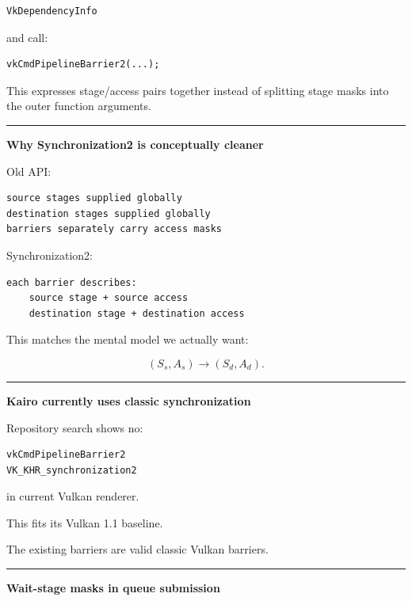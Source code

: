 \begin{verbatim}
VkDependencyInfo
\end{verbatim}

and call:

\begin{verbatim}
vkCmdPipelineBarrier2(...);
\end{verbatim}

This expresses stage/access pairs together instead of splitting stage masks into the outer function arguments.

\begin{center}\rule{0.5\linewidth}{0.5pt}\end{center}

\textbf{Why Synchronization2 is conceptually cleaner}

Old API:

\begin{verbatim}
source stages supplied globally
destination stages supplied globally
barriers separately carry access masks
\end{verbatim}

Synchronization2:

\begin{verbatim}
each barrier describes:
    source stage + source access
    destination stage + destination access
\end{verbatim}

This matches the mental model we actually want:

\[
(S_s,A_s)\rightarrow(S_d,A_d).
\]

\begin{center}\rule{0.5\linewidth}{0.5pt}\end{center}

\textbf{Kairo currently uses classic synchronization}

Repository search shows no:

\begin{verbatim}
vkCmdPipelineBarrier2
VK_KHR_synchronization2
\end{verbatim}

in current Vulkan renderer.

This fits its Vulkan 1.1 baseline.

The existing barriers are valid classic Vulkan barriers.

\begin{center}\rule{0.5\linewidth}{0.5pt}\end{center}

\textbf{Wait-stage masks in queue submission}

